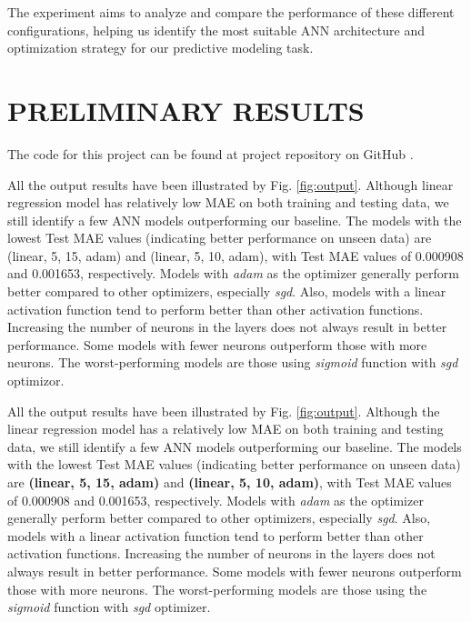 \documentclass[manuscript,screen,review,nonacm]{acmart}
\begin{document}
The experiment aims to analyze and compare the performance of these different configurations, helping us identify the most suitable ANN architecture and optimization strategy for our predictive modeling task.

\section{PRELIMINARY RESULTS}

The code for this project can be found at project repository on GitHub \citep{code}.

All the output results have been illustrated by Fig. \ref{fig:output}. Although linear regression model has relatively low MAE on both training and testing data, we still identify a few ANN models outperforming our baseline. The models with the lowest Test MAE values (indicating better performance on unseen data) are (linear, 5, 15, adam) and (linear, 5, 10, adam), with Test MAE values of 0.000908 and 0.001653, respectively.
Models with {\it adam} as the optimizer generally perform better compared to other optimizers, especially {\it sgd}. Also, models with a linear activation function tend to perform better than other activation functions.
Increasing the number of neurons in the layers does not always result in better performance. Some models with fewer neurons outperform those with more neurons.
The worst-performing models are those using {\it sigmoid} function with {\it sgd} optimizor.

All the output results have been illustrated by Fig. \ref{fig:output}. Although the linear regression model has a relatively low MAE on both training and testing data, we still identify a few ANN models outperforming our baseline. The models with the lowest Test MAE values (indicating better performance on unseen data) are \textbf{(linear, 5, 15, adam)} and \textbf{(linear, 5, 10, adam)}, with Test MAE values of 0.000908 and 0.001653, respectively.
Models with {\it adam} as the optimizer generally perform better compared to other optimizers, especially {\it sgd}. Also, models with a linear activation function tend to perform better than other activation functions.
Increasing the number of neurons in the layers does not always result in better performance. Some models with fewer neurons outperform those with more neurons.
The worst-performing models are those using the {\it sigmoid} function with {\it sgd} optimizer.
\end{document}
